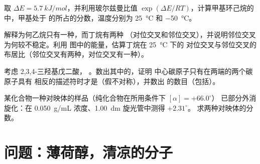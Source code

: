 \begin{exercise}[$\star\star$]\label{exo:b1:stereochemistry-in-depth:9}
取 $\Delta E = \qty{5.7}{kJ/mol}$，并利用玻尔兹曼比值
$\exp(\Delta E/RT)$，计算甲基环己烷的中，甲基处于
的所占的分数，温度分别为 \qty{25}{\celsius} 和 \qty{-50}{\celsius}。
\end{exercise}

\begin{exercise}[$\star\star\star$]\label{exo:b1:stereochemistry-in-depth:10}
解释为何乙烷只有一种，而丁烷有两种
（对位交叉和邻位交叉），并说明邻位交叉为何较不稳定。利用
图中的能量，估算丁烷在 \qty{25}{\celsius} 下的
对位交叉与邻位交叉的布居比（邻位交叉有两种，对位交叉有一种）。
\end{exercise}

\begin{exercise}[$\star\star\star$]\label{exo:b1:stereochemistry-in-depth:11}
考虑 2,3,4-三羟基戊二酸，
。数出其中的，证明
中心碳原子只有在两端的两个碳原子具有
相反的描述符时才是（假不对称），并数出
的数目（包括）。
\end{exercise}

\begin{exercise}[$\star\star\star$]\label{exo:b1:stereochemistry-in-depth:12}
某化合物一种对映体的样品（纯化合物在所用条件下 $[\alpha] = +66.0^\circ$）
已部分外消旋化：在
\qty{0.050}{g/mL} 浓度、\qty{1.00}{dm} 旋光管中测得 $+2.31^\circ$。
求两种对映体的分数。
\end{exercise}

\section{问题：薄荷醇，清凉的分子}


